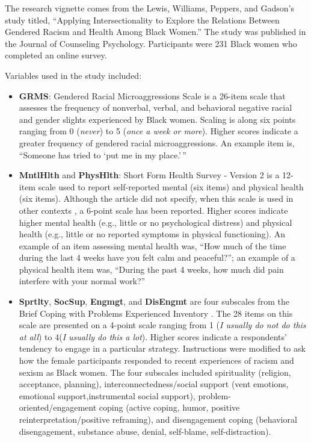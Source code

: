 \documentclass[
  11pt,
]{book}
\begin{document}
The research vignette comes from the Lewis, Williams, Peppers, and Gadson's \citeyearpar{lewis_applying_2017} study titled, ``Applying Intersectionality to Explore the Relations Between Gendered Racism and Health Among Black Women.'' The study was published in the Journal of Counseling Psychology. Participants were 231 Black women who completed an online survey.

Variables used in the study included:

\begin{itemize}
\item
  \textbf{GRMS}: Gendered Racial Microaggressions Scale \citep{lewis_construction_2015} is a 26-item scale that assesses the frequency of nonverbal, verbal, and behavioral negative racial and gender slights experienced by Black women. Scaling is along six points ranging from 0 (\emph{never}) to 5 (\emph{once a week or more}). Higher scores indicate a greater frequency of gendered racial microaggressions. An example item is, ``Someone has tried to `put me in my place.'\,''
\item
  \textbf{MntlHlth} and \textbf{PhysHlth}: Short Form Health Survey - Version 2 \citep{ware_comparison_1995} is a 12-item scale used to report self-reported mental (six items) and physical health (six items). Although the article did not specify, when this scale is used in other contexts \citep[e.g.,][]{kim_racial_2017}, a 6-point scale has been reported. Higher scores indicate higher mental health (e.g., little or no psychological distress) and physical health (e.g., little or no reported symptoms in physical functioning). An example of an item assessing mental health was, ``How much of the time during the last 4 weeks have you felt calm and peaceful?''; an example of a physical health item was, ``During the past 4 weeks, how much did pain interfere with your normal work?''
\item
  \textbf{Sprtlty}, \textbf{SocSup}, \textbf{Engmgt}, and \textbf{DisEngmt} are four subscales from the Brief Coping with Problems Experienced Inventory \citep{carver_you_1997}. The 28 items on this scale are presented on a 4-point scale ranging from 1 (\emph{I usually do not do this at all}) to 4(\emph{I usually do this a lot}). Higher scores indicate a respondents' tendency to engage in a particular strategy. Instructions were modified to ask how the female participants responded to recent experiences of racism and sexism as Black women. The four subscales included spirituality (religion, acceptance, planning), interconnectedness/social support (vent emotions, emotional support,instrumental social support), problem-oriented/engagement coping (active coping, humor, positive reinterpretation/positive reframing), and disengagement coping (behavioral disengagement, substance abuse, denial, self-blame, self-distraction).

\end{itemize}
\end{document}
